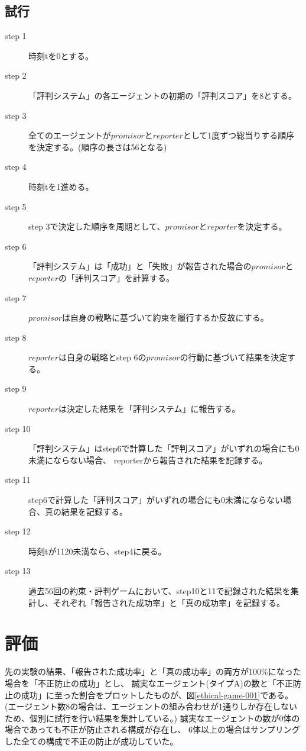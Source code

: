 \subsection{試行}
\begin{description}
  \item[step 1] 時刻tを0とする。
  \item[step 2] 「評判システム」の各エージェントの初期の「評判スコア」を8とする。
  \item[step 3] 全てのエージェントが$promisor$と$reporter$として1度ずつ総当りする順序を決定する。(順序の長さは56となる)
  \item[step 4] 時刻tを1進める。
  \item[step 5] step 3で決定した順序を周期として、$promisor$と$reporter$を決定する。
  \item[step 6] 「評判システム」は「成功」と「失敗」が報告された場合の$promisor$と$reporter$の「評判スコア」を計算する。
  \item[step 7] $promisor$は自身の戦略に基づいて約束を履行するか反故にする。
  \item[step 8] $reporter$は自身の戦略とstep 6の$promisor$の行動に基づいて結果を決定する。
  \item[step 9] $reporter$は決定した結果を「評判システム」に報告する。 
  \item[step 10] 「評判システム」はstep6で計算した「評判スコア」がいずれの場合にも0未満にならない場合、 reporterから報告された結果を記録する。
  \item[step 11] step6で計算した「評判スコア」がいずれの場合にも0未満にならない場合、真の結果を記録する。
  \item[step 12] 時刻tが1120未満なら、step4に戻る。
  \item[step 13] 過去56回の約束・評判ゲームにおいて、step10と11で記録された結果を集計し、それぞれ「報告された成功率」と「真の成功率」を記録する。
\end{description}

\section{評価}
先の実験の結果、「報告された成功率」と「真の成功率」の両方が100\%になった場合を「不正防止の成功」とし、
誠実なエージェント(タイプA)の数と「不正防止の成功」に至った割合をプロットしたものが、図\ref{ethical-game-001}である。
(エージェント数8の場合は、エージェントの組み合わせが1通りしか存在しないため、個別に試行を行い結果を集計している。)
誠実なエージェントの数が0体の場合であっても不正が防止される構成が存在し、
6体以上の場合はサンプリングした全ての構成で不正の防止が成功していた。

